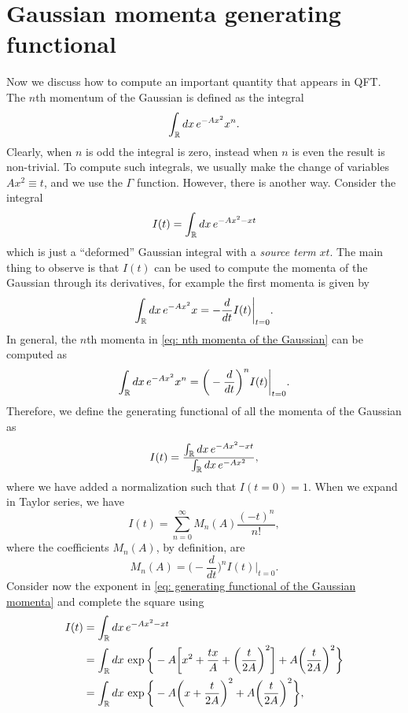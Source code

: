 \section{Gaussian momenta generating functional}
Now we discuss how to compute an important quantity that appears in QFT. The $n$th momentum of the Gaussian is defined as the integral
\begin{equation}
\label{eq: nth momenta of the Gaussian}
    \int_{\mathbb{R}} dx\,e^{-Ax^2}x^n.
\end{equation}
Clearly, when $n$ is odd the integral is zero, instead when $n$ is even the result is non-trivial. To compute such integrals, we usually make the change of variables $Ax^2 \equiv t$, and we use the $\Gamma$ function. However, there is another way. Consider the integral 
\begin{equation}
    I(t) = \int_{\mathbb{R}} dx\,e^{-Ax^2 - xt}
\end{equation}
which is just a ``deformed'' Gaussian integral with a \emph{source term} $xt$. The main thing to observe is that $I(t)$ can be used to compute the momenta of the Gaussian through its derivatives, for example the first momenta is given by
\begin{equation}
    \int_{\mathbb{R}} dx\,e^{-Ax^2}x = -\frac{d}{dt}I(t)\bigg|_{t = 0}.
\end{equation}
In general, the $n$th momenta in \eqref{eq: nth momenta of the Gaussian} can be computed as 
\begin{equation}
    \int_{\mathbb{R}} dx\,e^{-Ax^2}x^n = \bigg(-\frac{d}{dt}\bigg)^nI(t)\bigg|_{t = 0}.
\end{equation}
Therefore, we define the generating functional of all the momenta of the Gaussian as 
\begin{equation}
\label{eq: generating functional of the Gaussian momenta}
    I(t) = \frac{\int_{\mathbb{R}} dx\,e^{-Ax^2 - xt}}{\int_{\mathbb{R}} dx\,e^{-Ax^2}},
\end{equation}
where we have added a normalization such that $I(t = 0) = 1$. When we expand in Taylor series, we have 
\begin{equation}
    I(t) = \sum_{n=0}^\infty M_n(A)\frac{(-t)^n}{n!},
\end{equation}
where the coefficients $M_n(A)$, by definition, are 
\begin{equation}
    M_n(A) = \bigg(-\frac{d}{dt}\bigg)^nI(t)\bigg|_{t = 0}.
\end{equation}
Consider now the exponent in \eqref{eq: generating functional of the Gaussian momenta} and complete the square using 
\begin{equation}
    \begin{split}
        I(t) &= \int_{\mathbb{R}} dx\,e^{-Ax^2 - xt}\\
        &= \int_{\mathbb{R}} dx\,\exp{\bigg\{-A\bigg[x^2 + \frac{tx}{A} + \bigg(\frac{t}{2A}\bigg)^2\bigg] + A\bigg(\frac{t}{2A}\bigg)^2\bigg\}} \\
        &= \int_{\mathbb{R}} dx\,\exp{\bigg\{-A\bigg(x + \frac{t}{2A}\bigg)^2 + A\bigg(\frac{t}{2A}\bigg)^2\bigg\}},
    \end{split} 
\end{equation}
